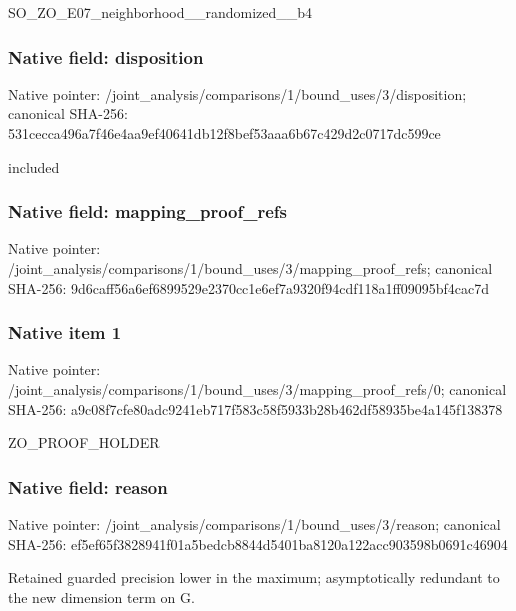 \documentclass[10pt,a4paper]{article}
\begin{document}
\begingroup\raggedright\sloppy SO\_\allowbreak{}ZO\_\allowbreak{}E07\_\allowbreak{}neighborhood\_\allowbreak{}\_\allowbreak{}randomized\_\allowbreak{}\_\allowbreak{}b4\par\endgroup

\subsubsection{Native field: disposition}
Native pointer: /joint\_\allowbreak{}analysis/comparisons/1/bound\_\allowbreak{}uses/3/disposition; canonical SHA-256: 531cecca496a7f46e4aa9ef40641db12f8bef53aaa6b67c429d2c0717dc599ce

\begingroup\raggedright\sloppy included\par\endgroup

\subsubsection{Native field: mapping\_\allowbreak{}proof\_\allowbreak{}refs}
Native pointer: /joint\_\allowbreak{}analysis/comparisons/1/bound\_\allowbreak{}uses/3/mapping\_\allowbreak{}proof\_\allowbreak{}refs; canonical SHA-256: 9d6caff56a6ef6899529e2370cc1e6ef7a9320f94cdf118a1ff09095bf4cac7d

\subsubsection{Native item 1}
Native pointer: /joint\_\allowbreak{}analysis/comparisons/1/bound\_\allowbreak{}uses/3/mapping\_\allowbreak{}proof\_\allowbreak{}refs/0; canonical SHA-256: a9c08f7cfe80adc9241eb717f583c58f5933b28b462df58935be4a145f138378

\begingroup\raggedright\sloppy ZO\_\allowbreak{}PROOF\_\allowbreak{}HOLDER\par\endgroup

\subsubsection{Native field: reason}
Native pointer: /joint\_\allowbreak{}analysis/comparisons/1/bound\_\allowbreak{}uses/3/reason; canonical SHA-256: ef5ef65f3828941f01a5bedcb8844d5401ba8120a122acc903598b0691c46904

\begingroup\raggedright\sloppy Retained guarded precision lower in the maximum;\allowbreak{} asymptotically redundant to the new dimension term on G.\par\endgroup
\end{document}
